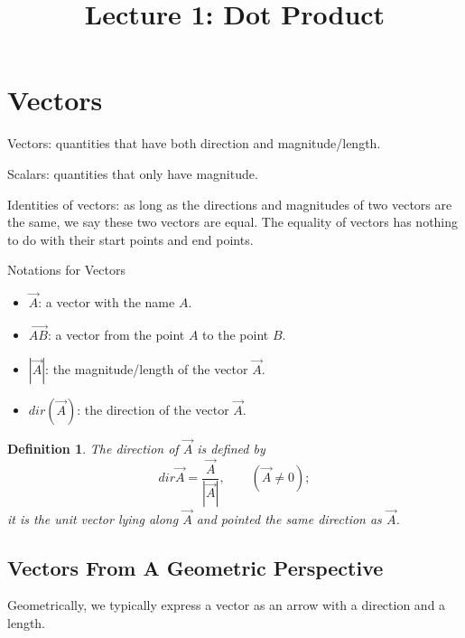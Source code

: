\documentclass{article}
\title{Lecture 1: Dot Product}
\author{}
\date{}
\begin{document}
\maketitle

\section{Vectors}

Vectors: quantities that have both direction and magnitude/length.

Scalars: quantities that only have magnitude.

Identities of vectors: as long as the directions and magnitudes of two vectors 
are the same, we say these two vectors are equal. The equality of vectors has 
nothing to do with their start points and end points.

\bigskip

Notations for Vectors
\begin{itemize}
	\item $\vec{A}$: a vector with the name $A$.
	\item $\vec{AB}$: a vector from the point $A$ to the point $B$.
	\item $|\vec{A}|$: the magnitude/length of the vector $\vec{A}$.
	\item $dir(\vec{A})$: the direction of the vector $\vec{A}$.
\end{itemize}


\newtheorem*{unnumbered_definition}{Definition}
\begin{unnumbered_definition}
	The direction of $\vec{A}$ is defined by 
	\[ dir \vec{A} = \frac{\vec{A}}{|\vec{A}|}, \qquad (\vec{A} \neq 0); \]
	it is the unit vector lying along $\vec{A}$ and pointed the same direction as
	$\vec{A}$.
\end{unnumbered_definition}

\bigskip

\subsection{Vectors From A Geometric Perspective}

Geometrically, we typically express a vector as an arrow with a direction and 
a length.

\smallskip
\end{document}
